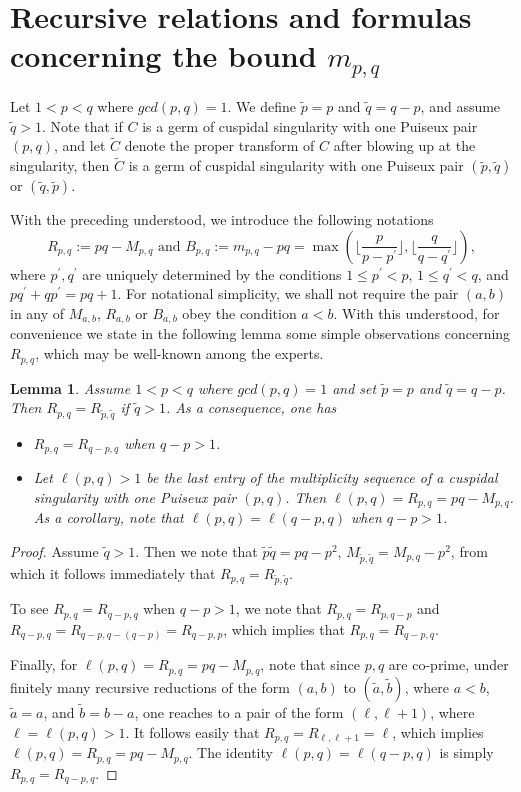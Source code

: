 \documentclass[11pt]{amsart}
\theoremstyle{plain}
\numberwithin{theorem}{section}
\newtheorem{lemma}[theorem]{Lemma}
\theoremstyle{definition}
\begin{document}
\section{Recursive relations and formulas concerning the bound $m_{p,q}$}

Let $1<p<q$ where $gcd(p,q)=1$. We define $\tilde{p}=p$ and $\tilde{q}=q-p$, and assume 
$\tilde{q}>1$. Note that if $C$ is a germ of cuspidal singularity with one Puiseux pair $(p,q)$, and let
$\tilde{C}$ denote the proper transform of $C$ after blowing up at the singularity, then 
$\tilde{C}$ is a germ of cuspidal singularity with one Puiseux pair $(\tilde{p},\tilde{q})$ or
$(\tilde{q},\tilde{p})$. 

With the preceding understood, we introduce the following notations
$$
R_{p,q}:=pq-M_{p,q} \mbox{ and } B_{p,q}:=m_{p,q}-pq=\max (\lfloor \frac{p}{p-p^\prime}\rfloor, \lfloor \frac{q}{q-q^\prime}\rfloor), 
$$
where $p^\prime,q^\prime$ are uniquely determined by the conditions $1\leq p^\prime<p$,
$1\leq q^\prime<q$, and $pq^\prime+qp^\prime=pq+1$. For notational simplicity, we shall not require 
the pair $(a,b)$ in any of $M_{a,b}$, $R_{a,b}$ or $B_{a,b}$ obey the condition $a<b$. With this 
understood, for convenience we state in the following lemma some simple observations concerning $R_{p,q}$, which may be well-known among the experts. 

\begin{lemma}
Assume $1<p<q$ where $gcd(p,q)=1$ and set $\tilde{p}=p$ and $\tilde{q}=q-p$.
Then $R_{p,q}=R_{\tilde{p},\tilde{q}}$ if $\tilde{q}>1$. As a consequence, one has 
\begin{itemize}
\item [{(1)}] $R_{p,q}=R_{q-p,q}$ when $q-p>1$. 
\item [{(2)}] Let $\ell(p,q)>1$ be the last entry of the multiplicity sequence of a cuspidal singularity with one Puiseux pair $(p,q)$. Then $\ell(p,q)=R_{p,q}=pq-M_{p,q}$. As a corollary, note that 
$\ell(p,q)=\ell(q-p,q)$ when $q-p>1$. 
\end{itemize}
\end{lemma}

\begin{proof}
Assume $\tilde{q}>1$. Then we note that $\tilde{p}\tilde{q}=pq-p^2$, $M_{\tilde{p},\tilde{q}}=M_{p,q}-p^2$, from which it follows immediately that $R_{p,q}=R_{\tilde{p},\tilde{q}}$. 

To see $R_{p,q}=R_{q-p,q}$ when $q-p>1$, we note that $R_{p,q}=R_{p,q-p}$ and 
$R_{q-p,q}=R_{q-p, q-(q-p)}=R_{q-p,p}$, which implies that $R_{p,q}=R_{q-p,q}$.

Finally, for $\ell(p,q)=R_{p,q}=pq-M_{p,q}$, note that since $p,q$ are co-prime, under finitely many recursive reductions of the form $(a,b)$ to $(\tilde{a},\tilde{b})$, where $a<b$, $\tilde{a}=a$, 
and $\tilde{b}=b-a$, one reaches to a pair of the form $(\ell,\ell+1)$,
where $\ell=\ell(p,q)>1$. It follows easily that $R_{p,q}=R_{\ell,\ell+1}=\ell$, which implies 
$\ell(p,q)=R_{p,q}=pq-M_{p,q}$. The identity $\ell(p,q)=\ell(q-p,q)$ is simply $R_{p,q}=R_{q-p,q}$.

\end{proof}
\end{document}
